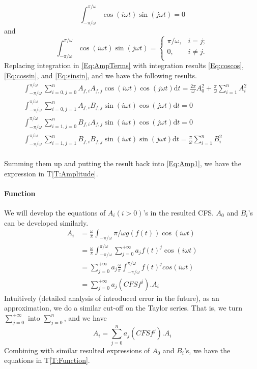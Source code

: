 \documentclass[12pt]{article}
\newcommand{\tref}[1]{T\ref{#1}}
\begin{document}
\begin{equation}\label{Eq:cossin}
\int_{-\pi/\omega}^{\pi/\omega}\cos(i\omega t)\sin(j\omega t)=0
\end{equation}
and
\begin{equation}\label{Eq:sinsin}
\int_{-\pi/\omega}^{\pi/\omega}\cos(i\omega t)\sin(j\omega t)=\begin{cases}
\pi/\omega, &i=j;\\
0, &i\neq j.\\
\end{cases}
\end{equation}
Replacing integration in \autoref{Eq:AmpTerms} 
with integration results \autoref{Eq:coscos}, 
\autoref{Eq:cossin}, and \autoref{Eq:sinsin}, and we have the following results.
\begin{equation}\label{Eq:AmpTermsResult}
\begin{aligned}
&\int_{-\pi/\omega}^{\pi/\omega}\sum_{i=0,j=0}^{n}A_{f,i}A_{f,j}
\cos(i\omega t)\cos(j\omega t)\text{d} t
=\frac{2\pi}{\omega}A_0^2+\frac{\pi}{\omega}\sum_{i=1}^{n}A_i^2\\
&\int_{-\pi/\omega}^{\pi/\omega}\sum_{i=0,j=1}^{n}A_{f,i}B_{f,j}
\sin(i\omega t)\cos(j\omega t)\text{d} t
=0\\
&\int_{-\pi/\omega}^{\pi/\omega}\sum_{i=1,j=0}^{n}B_{f,i}A_{f,j}
\sin(i\omega t)\cos(j\omega t)\text{d} t
=0\\
&\int_{-\pi/\omega}^{\pi/\omega}\sum_{i=1,j=1}^{n}B_{f,i}B_{f,j}
\sin(i\omega t)\sin(j\omega t)\text{d} t
=\frac{\pi}{\omega}\sum_{i=1}^{n}B_i^2\\
\end{aligned}
\end{equation}

Summing them up and putting the result back into 
\autoref{Eq:Amp1}, we have the expression 
in \tref{T:Amplitude}.
\paragraph{Function}
We will develop the equations of $A_i(i>0)$'s in the resulted CFS. $A_0$ and $B_i$'s can be developed similarly.
\begin{align}
	A_i&=\frac{\omega}{\pi}\int_{-\pi/\omega}{\pi/\omega}g(f(t))\cos(i\omega t)\\
	&=\frac{\omega}{\pi}\int_{-\pi/\omega}^{\pi/\omega}\sum_{j=0}^{+\infty}a_jf(t)^j\cos(i\omega t)\\
	&=\sum_{j=0}^{+\infty}a_j\frac{\omega}{\pi}\int_{-\pi/\omega}^{\pi/\omega}f(t)^jcos(i\omega t)\\
	&=\sum_{j=0}^{+\infty}a_j(\mathit{CFSf}^j).A_i
\end{align}
Intuitively (detailed analysis of introduced error in the future), as an approximation, we do a similar cut-off on the Taylor series. That is, we turn $\sum_{j=0}^{+\infty}$ into $\sum_{j=0}^{n}$, and we have
\begin{equation}
	A_i=\sum_{j=0}^{n}a_j(\mathit{CFSf}^j).A_i
\end{equation}
Combining with similar resulted expressions of $A_0$ and $B_i$'s, we have the equations in \tref{T:Function}.
\end{document}
